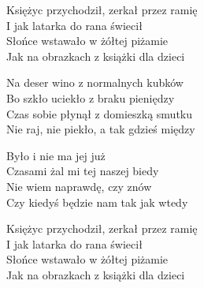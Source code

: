 \begin{text}
    Księżyc przychodził, zerkał przez ramię\\
    I jak latarka do rana świecił\\
    Słońce wstawało w żółtej piżamie\\
    Jak na obrazkach z książki dla dzieci

    Na deser wino z normalnych kubków\\
    Bo szkło uciekło z braku pieniędzy\\
    Czas sobie płynął z domieszką smutku\\
    Nie raj, nie piekło, a tak gdzieś między

    Było i nie ma jej już\\
    Czasami żal mi tej naszej biedy\\
    Nie wiem naprawdę, czy znów\\
    Czy kiedyś będzie nam tak jak wtedy

    Księżyc przychodził, zerkał przez ramię\\
    I jak latarka do rana świecił\\
    Słońce wstawało w żółtej piżamie\\
    Jak na obrazkach z książki dla dzieci
\end{text}
\begin{chord}

\end{chord}